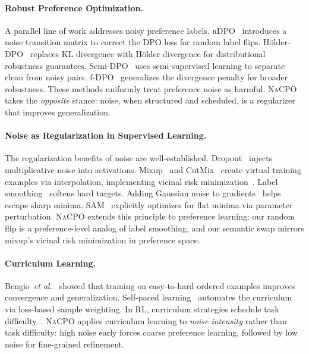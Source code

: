 \documentclass{article}
\newcommand{\nacpo}{\textsc{NaCPO}}
\newcommand{\rdpo}{\textsc{rDPO}}
\newcommand{\etal}{\textit{et al.}}
\begin{document}
\paragraph{Robust Preference Optimization.}
A parallel line of work addresses noisy preference labels.
\rdpo{}~\cite{PLACEHOLDER_chowdhury2024provably} introduces a noise transition matrix to correct the DPO loss for random label flips.
H\"{o}lder-DPO~\cite{PLACEHOLDER_holder_dpo} replaces KL divergence with H\"{o}lder divergence for distributional robustness guarantees.
Semi-DPO~\cite{PLACEHOLDER_semi_dpo} uses semi-supervised learning to separate clean from noisy pairs.
f-DPO~\cite{PLACEHOLDER_f_dpo} generalizes the divergence penalty for broader robustness.
These methods uniformly treat preference noise as harmful.
\nacpo{} takes the \emph{opposite} stance: noise, when structured and scheduled, is a regularizer that improves generalization.

\paragraph{Noise as Regularization in Supervised Learning.}
The regularization benefits of noise are well-established.
Dropout~\cite{PLACEHOLDER_srivastava2014dropout} injects multiplicative noise into activations.
Mixup~\cite{PLACEHOLDER_zhang2018mixup} and CutMix~\cite{PLACEHOLDER_yun2019cutmix} create virtual training examples via interpolation, implementing vicinal risk minimization~\cite{PLACEHOLDER_chapelle2001vicinal}.
Label smoothing~\cite{PLACEHOLDER_muller2019does} softens hard targets.
Adding Gaussian noise to gradients~\cite{PLACEHOLDER_neelakantan2015adding} helps escape sharp minima.
SAM~\cite{PLACEHOLDER_foret2021sharpness} explicitly optimizes for flat minima via parameter perturbation.
\nacpo{} extends this principle to preference learning: our random flip is a preference-level analog of label smoothing, and our semantic swap mirrors mixup's vicinal risk minimization in preference space.

\paragraph{Curriculum Learning.}
Bengio~\etal{}~\cite{PLACEHOLDER_bengio2009curriculum} showed that training on easy-to-hard ordered examples improves convergence and generalization.
Self-paced learning~\cite{PLACEHOLDER_kumar2010self} automates the curriculum via loss-based sample weighting.
In RL, curriculum strategies schedule task difficulty~\cite{PLACEHOLDER_narvekar2020curriculum}.
\nacpo{} applies curriculum learning to \emph{noise intensity} rather than task difficulty: high noise early forces coarse preference learning, followed by low noise for fine-grained refinement.
\end{document}
